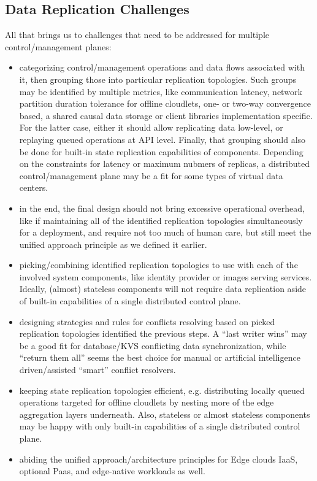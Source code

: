 \documentclass[conference]{IEEEtran}
\begin{document}
\subsection{Data Replication Challenges}
All that brings us to challenges that need to be addressed for multiple
control/management planes:
\begin{itemize}
  \item categorizing control/management operations and data flows associated
    with it, then grouping those into particular replication topologies. Such
    groups may be identified by multiple metrics, like communication latency,
    network partition duration tolerance for offline cloudlets, one- or two-way
    convergence based, a shared causal data storage or client libraries
    implementation specific. For the latter case, either it should allow
    replicating data low-level, or replaying queued operations at API level.
    Finally, that grouping should also be done for built-in state replication
    capabilities of components. Depending on the constraints for latency or
    maximum nubmers of replicas, a distributed control/management plane may be
    a fit for some types of virtual data centers\cite{b3}.
  \item in the end, the final design should not bring excessive operational
    overhead, like if maintaining all of the identified replication topologies
    simultaneously for a deployment, and require not too much of human care,
    but still meet the unified approach principle as we defined it earlier.
  \item picking/combining identified replication topologies to use with each of
    the involved system components, like identity provider or images serving
    services. Ideally, (almost) stateless components will not require data
    replication aside of built-in capabilities of a single distributed control
    plane.
  \item designing strategies and rules for conflicts resolving based on picked
    replication topologies identified the previous steps. A ``last writer
    wins'' may be a good fit for database/KVS conflicting data synchronization,
    while ``return them all'' seems the best choice for manual or artificial
    intelligence driven/assisted ``smart'' conflict resolvers.
  \item keeping state replication topologies efficient, e.g. distributing
    locally queued operations targeted for offline cloudlets by nesting more of
    the edge aggregation layers underneath. Also, stateless or almost stateless
    components may be happy with only built-in capabilities of a single
    distributed control plane.
  \item abiding the unified approach/architecture principles for Edge clouds
    IaaS, optional Paas, and edge-native workloads as well.
\end{itemize}
\end{document}
